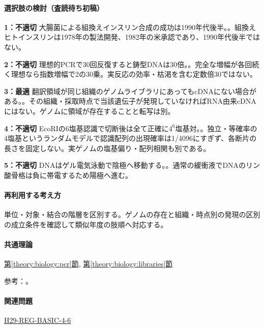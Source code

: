 \paragraph{選択肢の検討（査読待ち初稿）}\mbox{}\par

\noindent\textbf{1：不適切} 大腸菌による組換えインスリン合成の成功は1990年代後半。。組換えヒトインスリンは1978年の製法開発、1982年の米承認であり、1990年代後半ではない。\par

\noindent\textbf{2：不適切} 理想的PCRで30回反復すると鋳型DNAは30倍。。完全な増幅が各回続く理想なら指数増幅で2の30乗。実反応の効率・枯渇を含む定数倍30ではない。\par

\noindent\textbf{3：最適} 翻訳領域が同じ組織のゲノムライブラリにあってもcDNAにない場合がある。。その組織・採取時点で当該遺伝子が発現していなければRNA由来cDNAにはない。ゲノムに領域が存在することと転写は別。\par

\noindent\textbf{4：不適切} EcoRIの6塩基認識で切断後は全て正確に\(4^6\)塩基対。。独立・等確率の4塩基というランダムモデルで認識配列の出現確率は1/4096にすぎず、各断片の長さを固定しない。実ゲノムの塩基偏り・配列相関も別である。\par

\noindent\textbf{5：不適切} DNAはゲル電気泳動で陰極へ移動する。。通常の緩衝液でDNAのリン酸骨格は負に帯電するため陽極へ進む。\par

\paragraph{再利用する考え方} 単位・対象・結合の階層を区別する。ゲノムの存在と組織・時点別の発現の区別の成立条件を確認して類似年度の肢順へ対応する。

\paragraph{共通理論} \hyperref[theory:biology:pcr]{第\ref*{theory:biology:pcr}節}, \hyperref[theory:biology:libraries]{第\ref*{theory:biology:libraries}節}

\par 参考：\cite{neb_pcr,fda_insulin,neb_ecori,nhgri_cdna}。

\paragraph{関連問題} \hyperref[q:h29-reg-basic-4-6]{H29-REG-BASIC-4-6}

